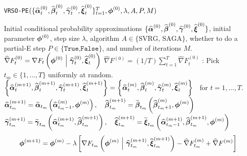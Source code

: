 \begin{algorithm}
\caption{\texttt{VRSO-PE}$(\{\widehat {\boldsymbol{\alpha}}_t^{(0)}, \widehat {\boldsymbol{\beta}}_t^{(0)}, \widehat {\boldsymbol{\gamma}}_t^{(0)}, \widehat {\boldsymbol{\xi}}_t^{(0)}\}_{t=1}^T,\boldsymbol{\phi}^{(0)},\lambda,A,P,M)$}\label{alg:VRSO-PE}
\begin{algorithmic}[1]
\Require Initial conditional probability approximations $\{\widehat {\boldsymbol{\alpha}}^{(0)}, \widehat {\boldsymbol{\beta}}^{(0)}, \widehat {\boldsymbol{\gamma}}^{(0)}, \widehat {\boldsymbol{\xi}}^{(0)}\}$, initial parameter $\boldsymbol{\phi}^{(0)}$, step size $\lambda$, algorithm $A \in \{\text{SVRG, SAGA}\}$, whether to do a partial-E step $P \in \{\texttt{True,False}\}$, and number of iterations $M$.
%
 
    \State $\widehat \nabla F^{(0)}_{t} = \nabla F_t\left(\boldsymbol{\phi}^{(0)} ~ \Big | ~ \widehat {\boldsymbol{\gamma}}^{(0)}_{t}, \widehat {\boldsymbol{\xi}}^{(0)}_{t}\right)$ 
\EndFor
\State $\widehat \nabla F^{(0)} = (1/T) \sum_{t=1}^T \widehat \nabla F^{(0)}_{t}$
%
\vspace{10pt}
%
:
    \State Pick $t_m \in \{1,\ldots,T\}$ uniformly at random.
    \vspace{10pt}
    \State $\left\{\widehat {\boldsymbol{\alpha}}^{(m+1)}_t, \widehat {\boldsymbol{\beta}}^{(m+1)}_t, \widehat {\boldsymbol{\gamma}}^{(m+1)}_t, \widehat {\boldsymbol{\xi}}^{(m+1)}_t\right\} = \left\{\widehat {\boldsymbol{\alpha}}^{(m)}_{t}, \widehat {\boldsymbol{\beta}}^{(m)}_{t}, \widehat {\boldsymbol{\gamma}}^{(m)}_{t}, \widehat {\boldsymbol{\xi}}^{(m)}_{t}\right\} \enspace$ for $t = 1,\ldots,T$.
    \vspace{5pt}
     
    \State $\widehat {\boldsymbol{\alpha}}_{t_m}^{(m+1)} = \widetilde {\boldsymbol{\alpha}}_{t_m}\left(\widehat {\boldsymbol{\alpha}}_{t_m-1}^{(m)},\boldsymbol{\phi}^{(m)}\right), \quad \widehat {\boldsymbol{\beta}}_{t_m}^{(m+1)} = \widetilde {\boldsymbol{\beta}}_{t_m}\left(\widehat {\boldsymbol{\beta}}_{t_m+1}^{(m)},\boldsymbol{\phi}^{(m)}\right)$ 
    \vspace{5pt}
    \State $\widehat {\boldsymbol{\gamma}}_{t_m}^{(m+1)} = \widetilde {\boldsymbol{\gamma}}_{t_m}\left(\widehat {\boldsymbol{\alpha}}_{t_m}^{(m+1)},\widehat {\boldsymbol{\beta}}_{t_m}^{(m+1)}\right), 
    \quad \widehat {\boldsymbol{\xi}}_{t_m}^{(m+1)} = \widetilde {\boldsymbol{\xi}}_{t_m}\left(\widehat {\boldsymbol{\alpha}}_{t_m-1}^{(m+1)},\widehat {\boldsymbol{\beta}}_{t_m}^{(m+1)},\boldsymbol{\phi}^{(m)}\right)$
    \EndIf
    \vspace{10pt}
    \State {}
    \begin{gather}
        \bfphi^{(m+1)} = \bfphi^{(m)} - \lambda \left[\nabla F_{t_m}\left(\bfphi^{(m)} ~ \Big | ~ \widehat \bfgamma_{t_m}^{(m+1)}, \widehat \bfxi_{t_m}^{(m+1)}\right) - \widehat \nabla F^{(m)}_{t_m} + \widehat \nabla F^{(m)} \right]

\end{gather}
\end{algorithmic}
\end{algorithm}
